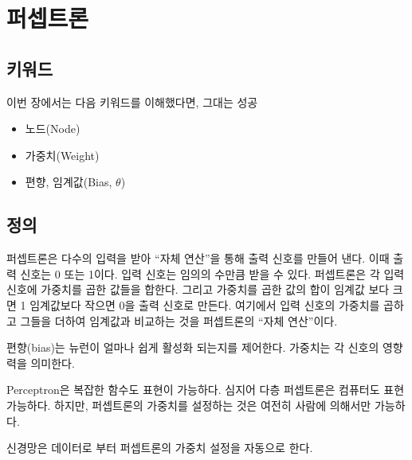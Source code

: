 	\clearpage
	\section{퍼셉트론}
	
	\subsection{키워드}
	이번 장에서는 다음 키워드를 이해했다면, 그대는 성공~
	\begin{itemize}
		\item 노드(Node)
		\item 가중치(Weight)
		\item 편향, 임계값(Bias, $\theta$)
	\end{itemize}
	
	\subsection{정의}
	퍼셉트론은 다수의 입력을 받아 ``자체 연산''을 통해 출력 신호를 만들어 낸다. 이때 출력 신호는 0 또는 1이다. 입력 신호는 임의의 수만큼 받을 수 있다. 퍼셉트론은 각 입력 신호에 가중치를 곱한 값들을 합한다. 그리고 가중치를 곱한 값의 합이 임계값 보다 크면 1 임계값보다 작으면 0을 출력 신호로 만든다. 여기에서 입력 신호의 가중치를 곱하고 그들을 더하여 임계값과 비교하는 것을 퍼셉트론의 ``자체 연산''이다.
	


	편향(bias)는 뉴런이 얼마나 쉽게 활성화 되는지를 제어한다.
	가중치는 각 신호의 영향력을 의미한다.
	
	
	Perceptron은 복잡한 함수도 표현이 가능하다. 심지어 다층 퍼셉트론은 컴퓨터도 표현 가능하다.
	하지만, 퍼셉트론의 가중치를 설정하는 것은 여전히 사람에 의해서만 가능하다.
	
	신경망은 데이터로 부터 퍼셉트론의 가중치 설정을 자동으로 한다.
	